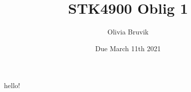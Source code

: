\documentclass{article}
\title{STK4900 Oblig 1}
\author{Olivia Bruvik}
\date{Due March 11th 2021}
\begin{document}
	\maketitle

	hello!
\end{document}
